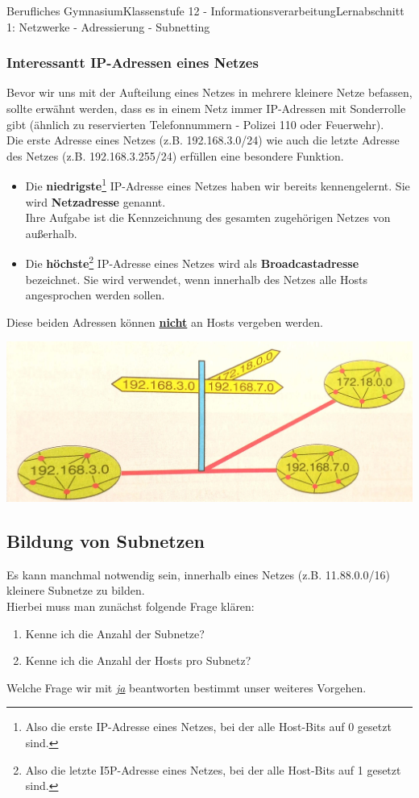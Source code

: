 \documentclass[11pt,oneside,openany,headings=optiontotoc,11pt,numbers=noenddot]{article}
\begin{document}
	\begin{worksheet}{Berufliches Gymnasium}{Klassenstufe 12 - Informationsverarbeitung}{Lernabschnitt 1: Netzwerke - Adressierung - Subnetting}
		\setcounter{section}{1}
		\setcounter{subsection}{2}
		\subsubsection*{Interessantt IP-Adressen eines Netzes}
		Bevor wir uns mit der Aufteilung eines Netzes in mehrere kleinere Netze befassen, sollte erwähnt werden, dass es in einem Netz immer IP-Adressen mit Sonderrolle gibt (ähnlich zu reservierten Telefonnummern - Polizei 110 oder Feuerwehr).\\
		Die erste Adresse eines Netzes (z.B. 192.168.3.0/24) wie auch die letzte Adresse des Netzes (z.B. 192.168.3.255/24) erfüllen eine besondere Funktion.
		\begin{itemize}[label=-]
			\item Die \textbf{niedrigste}\footnote{Also die erste IP-Adresse eines Netzes, bei der alle Host-Bits auf 0 gesetzt sind.} IP-Adresse eines Netzes haben wir bereits kennengelernt. Sie wird \textbf{Netzadresse} genannt.\\
			Ihre Aufgabe ist die Kennzeichnung des gesamten zugehörigen Netzes von außerhalb.
			\item Die \textbf{höchste}\footnote{Also die letzte I5P-Adresse eines Netzes, bei der alle Host-Bits auf 1 gesetzt sind.} IP-Adresse eines Netzes wird als \textbf{Broadcastadresse} bezeichnet. Sie wird verwendet, wenn innerhalb des Netzes alle Hosts angesprochen werden sollen.
		\end{itemize}
		Diese beiden Adressen können \underline{\textbf{nicht}} an Hosts vergeben werden.\\
		\par\noindent
		\includegraphics[width=\textwidth]{../99_Bilder/042_Skr_Sonder.jpg}
		\subsection{Bildung von Subnetzen}
		Es kann manchmal notwendig sein, innerhalb eines Netzes (z.B. 11.88.0.0/16) kleinere Subnetze zu bilden.\\
		Hierbei muss man zunächst folgende Frage klären:
		\begin{enumerate}
			\item Kenne ich die Anzahl der Subnetze?
			\item Kenne ich die Anzahl der Hosts pro Subnetz?
		\end{enumerate}
		Welche Frage wir mit \textit{\underline{ja}} beantworten bestimmt unser weiteres Vorgehen.

\end{worksheet}
\end{document}
